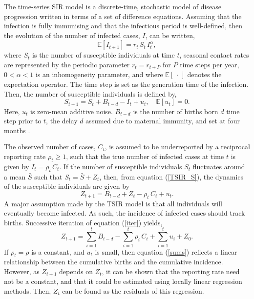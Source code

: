 \documentclass[10pt]{article}
\begin{document}
The time-series SIR model \cite{Finkenstadt2000} is a discrete-time, stochastic model of disease progression written in terms of a set of difference equations. Assuming that the infection is fully immunising and that the infectious period is well-defined, then the evolution of the number of infected cases, $I$, can be written,
\begin{equation}
\mathbb{E}\left[I_{t+1}\right] = r_t \, S_t \, I_t^\alpha,
\label{TSIR_I}
\end{equation}
where $S_t$ is the number of susceptible individuals at time $t$, seasonal contact rates are represented by the periodic parameter $r_t = r_{t+P}$ for $P$ time steps per year, $0 < \alpha < 1$ is an inhomogeneity parameter, and where $\mathbb{E}\left[\,\cdot\,\right]$ denotes the expectation operator. The time step is set as the generation time of the infection. Then, the number of susceptible individuals is defined by,
\begin{equation}
S_{t+1} = S_t + B_{t-d} - I_t + u_t, \quad \mathbb{E}\left[u_t\right] = 0.
\label{TSIR_S}
\end{equation}
Here, $u_t$ is  zero-mean additive noise. $B_{t-d}$ is the number of births born $d$ time step prior to $t$, the delay $d$ assumed due to maternal immunity, and set at four months \cite{Anderson1991}.

The observed number of cases, $C_t$, is assumed to be underreported by a reciprocal reporting rate $\rho_t \ge 1$, such that the true number of infected cases at time $t$ is given by $I_t = \rho_t \,C_t$. If the number of susceptible individuals $S_t$ fluctuates around a mean $\bar{S}$ such that $S_t = \bar{S} + Z_t$, then, from equation (\ref{TSIR_S}), the dynamics of the susceptible individuals are given by
\begin{equation}
Z_{t+1} = B_{t-d} + Z_{t} - \rho_t\,C_t + u_t.
\label{iter}
\end{equation}
A major assumption made by the TSIR model is that all individuals will eventually become infected. As such, the incidence of infected cases should track births. Successive iteration of equation (\ref{iter}) yields,
\begin{equation}
Z_{t+1} = \sum_{i=1}^t B_{i-d} - \sum_{i=1}^t \rho_i \, C_i + \sum_{i=1}^t u_i + Z_0.
\label{sums}
\end{equation}
If $\rho_t = \rho$ is a constant, and $u_t$ is small, then equation (\ref{sums}) reflects a linear relationship between the cumulative births and the cumulative incidence. However, as $Z_{t+1}$ depends on $Z_t$, it can be shown that the reporting rate need not be a constant, and that it could be estimated using locally linear regression methods. Then, $Z_t$ can be found as the residuals of this regression. 
\end{document}
